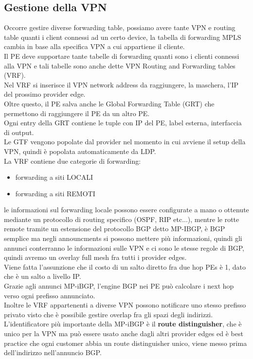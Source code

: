 \documentclass[12pt, oneside]{extbook} %
\begin{document}
\subsection{Gestione della VPN}
Occorre gestire diverse forwarding table, possiamo avere tante VPN e routing table quanti i client connessi ad un certo device, la tabella di forwarding MPLS cambia in base alla specifica VPN a cui appartiene il cliente.
\\Il PE deve supportare tante tabelle di forwarding quanti sono i clienti connessi alla VPN e tali tabelle sono anche dette VPN Routing and Forwarding tables (VRF).
\\Nel VRF si inserisce il VPN network address da raggiungere, la maschera, l'IP del prossimo provider edge.
\\Oltre questo, il PE salva anche le Global Forwarding Table (GRT) che permettono di raggiungere il PE da un altro PE.
\\Ogni entry della GRT contiene le tuple con IP del PE, label esterna, interfaccia di output.
\\Le GTF vengono popolate dal provider nel momento in cui avviene il setup della VPN, quindi è popolata automaticamente da LDP.
\\La VRF contiene due categorie di forwarding:
\begin{itemize}
    \item forwarding a siti LOCALI
    \item forwarding a siti REMOTI
\end{itemize}
le informazioni sul forwarding locale possono essere configurate a mano o ottenute mediante un protocollo di routing specifico (OSPF, RIP etc...), mentre le rotte remote tramite un estensione del protocollo BGP detto MP-IBGP, è BGP semplice ma negli announcments si possono mettere più informazioni, quindi gli annunci conterranno le informazioni sulle VPN e ci sono le stesse regole di BGP, quindi avremo un overlay full mesh fra tutti i provider edges.
\\Viene fatta l'assunzione che il costo di un salto diretto fra due hop PEs è 1, dato che è un salto a livello IP.
\\Grazie agli annunci MP-iBGP, l'engine BGP nei PE può calcolare i next hop verso ogni prefisso annunciato.
\\Inoltre le VRF appartenenti a diverse VPN possono notificare uno stesso prefisso privato visto che è possibile gestire overlap fra gli spazi degli indirizzi. 
\\L'identificatore più importante della MP-iBGP è il \textbf{route distinguisher}, che è unico per la VPN ma può essere usato anche dagli altri provider edges ed è best practice che ogni customer abbia un route distinguisher unico, viene messo prima dell'indirizzo nell'annuncio BGP.\\
\end{document}
